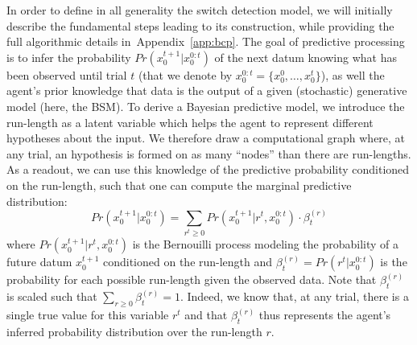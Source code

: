 \documentclass[12pt,english]{article}%
\newcommand{\eql}[1]{\begin{equation}#1\end{equation}}
\newcommand{\seeEq}[1]{Equation~\ref{eq:#1}}
\newcommand{\seeApp}[1]{Appendix~\ref{app:#1}}
\begin{document}
In order to define in all generality the switch detection model,
we will initially describe the fundamental steps leading to its construction,
while providing the full algorithmic details in~\seeApp{bcp}.
The goal of predictive processing
is to infer the probability $Pr(x_0^{t+1} | x_0^{0:t})$ of the next datum
knowing what has been observed until trial $t$
(that we denote by $x_0^{0:t} = \{ x_0^0, \ldots, x_0^t \}$), as well the agent's prior knowledge
that data is the output of a given (stochastic) generative model (here, the BSM).
To derive a Bayesian predictive model, we introduce
the run-length as a latent variable which helps the agent to represent
different hypotheses about the input. 
We therefore draw a computational graph where, at any trial,
an hypothesis is formed on as many ``nodes'' than there are run-lengths.
%
%
As a readout, we can use this knowledge of the predictive probability conditioned on the run-length,
such that one can compute the marginal predictive distribution:
\eql{
Pr(x_0^{t+1} | x_0^{0:t}) =
\sum_{r^{t}\geq 0} Pr(x_0^{t+1} | r^{t}, x_0^{0:t}) \cdot \beta^{(r)}_t
\label{eq:pred}
}
where $Pr(x_0^{t+1} | r^{t}, x_0^{0:t})$ is
the Bernouilli process modeling the probability of a future datum $x_0^{t+1}$
conditioned on the run-length and
$\beta^{(r)}_t=Pr(r^t | x_0^{0:t})$ is the probability for each possible run-length given the observed data.
Note that $\beta^{(r)}_t$ is scaled such that $\sum_{r \geq 0 } \beta^{(r)}_t = 1$.
Indeed, we know that, at any trial, there is a single true value for this variable $r^{t}$
and that $\beta^{(r)}_t$ thus represents the agent's inferred probability distribution over the run-length $r$. %
\end{document}
